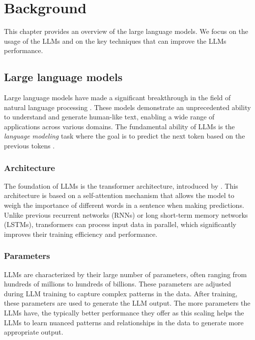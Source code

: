 \chapter{Background}
\label{chap:background}

This chapter provides an overview of the large language models. We focus on the usage of the LLMs and on the key techniques that can improve the LLMs performance.


\section{Large language models}

Large language models have made a significant breakthrough in the field of natural language processing \cite{Peters2018,Devlin2019,Brown2020}.
These models demonstrate an unprecedented ability to understand and generate human-like text, enabling a wide range of applications across various domains. The fundamental ability of LLMs is the \emph{language modeling} task where the goal is to predict the next token based on the previous tokens \cite{Bengio2000}.


\subsection{Architecture}

The foundation of LLMs is the transformer architecture, introduced by \citet{Vaswani2017}. This architecture is based on a self-attention mechanism that allows the model to weigh the importance of different words in a sentence when making predictions. Unlike previous recurrent networks (RNNs) or long short-term memory networks (LSTMs), transformers can process input data in parallel, which significantly improves their training efficiency and performance.


\subsection{Parameters}

LLMs are characterized by their large number of parameters, often ranging from hundreds of millions to hundreds of billions. These parameters are adjusted during LLM training to capture complex patterns in the data. After training, these parameters are used to generate the LLM output. The more parameters the LLMs have, the typically better performance they offer \cite{Kaplan2020} as this scaling helps the LLMs to learn nuanced patterns and relationships in the data to generate more appropriate output.


